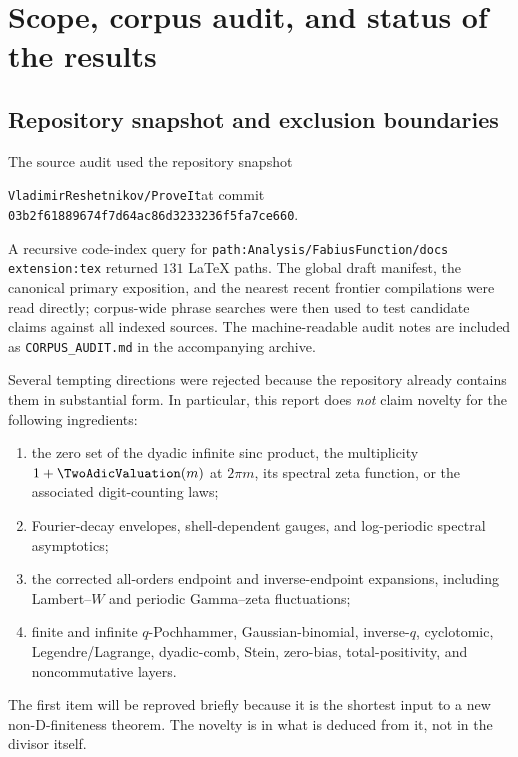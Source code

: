 \documentclass[11pt]{article}
\numberwithin{equation}{section}
\theoremstyle{definition}
\theoremstyle{remark}
\begin{document}
\begin{abstract}
All theorem and corollary environments below are proved in the text.  Exact
computations are labelled separately.  The golden-overlap rank recurrence and
the proposed differential-transcendence and inverse-sampling statements are
explicitly presented as conjectures.
\end{abstract}

\tableofcontents
\newpage

\section{Scope, corpus audit, and status of the results}
\label{sec:audit}

\subsection{Repository snapshot and exclusion boundaries}

The source audit used the repository snapshot
\begin{center}
\small\texttt{VladimirReshetnikov/ProveIt}\quad at commit\quad
\texttt{03b2f61889674f7d64ac86d3233236f5fa7ce660}.
\end{center}
A recursive code-index query for
\texttt{path:Analysis/FabiusFunction/docs extension:tex} returned $131$ LaTeX
paths.  The global draft manifest, the canonical primary exposition, and the
nearest recent frontier compilations were read directly; corpus-wide phrase
searches were then used to test candidate claims against all indexed sources.
The machine-readable audit notes are included as \texttt{CORPUS\_AUDIT.md} in
the accompanying archive.

Several tempting directions were rejected because the repository already
contains them in substantial form.  In particular, this report does \emph{not}
claim novelty for the following ingredients:
\begin{enumerate}[label=(\roman*)]
  \item the zero set of the dyadic infinite sinc product, the multiplicity
        $1+\TwoAdicValuation(m)$ at $2\pi m$, its spectral zeta function, or the associated
        digit-counting laws;
  \item Fourier-decay envelopes, shell-dependent gauges, and log-periodic
        spectral asymptotics;
  \item the corrected all-orders endpoint and inverse-endpoint expansions,
        including Lambert--$W$ and periodic Gamma--zeta fluctuations;
  \item finite and infinite $q$-Pochhammer, Gaussian-binomial, inverse-$q$,
        cyclotomic, Legendre/Lagrange, dyadic-comb, Stein, zero-bias,
        total-positivity, and noncommutative layers.
\end{enumerate}
The first item will be reproved briefly because it is the shortest input to a
new non-D-finiteness theorem.  The novelty is in what is deduced from it, not in
the divisor itself.
\end{document}
